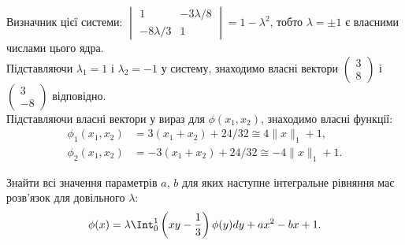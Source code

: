 \begin{solution}
    Визначник цієї системи: $\begin{vmatrix} 1 & - 3\lambda / 8 \\ - 8\lambda / 3 & 1 \end{vmatrix} = 1 - \lambda^2$, тобто $\lambda = \pm 1$ є власними числами цього ядра.\\
    
    Підставляючи $\lambda_1 = 1$ і $\lambda_2 = - 1$ у систему, знаходимо власні вектори $\begin{pmatrix} 3 \\ 8 \end{pmatrix}$ і $\begin{pmatrix} 3 \\ -8 \end{pmatrix}$ відповідно.\\
    
    Підставляючи власні вектори у вираз для $\phi(x_1, x_2)$, знаходимо власні функції:
    \begin{equation*}
        \begin{aligned}
            \phi_1(x_1, x_2) &= 3(x_1 + x_2) + 24 / 32 \cong 4 \|x\|_1 + 1, \\
            \phi_2(x_1, x_2) &= - 3(x_1 + x_2) + 24 / 32 \cong - 4 \|x\|_1 + 1.
        \end{aligned}
    \end{equation*}
\end{solution}

\begin{problem}[5.26.4, Владимиров]
    Знайти всі значення параметрів $a$, $b$ для яких наступне інтегральне рівняння має розв'язок для довільного $\lambda$:
    \[
        \phi(x) = \lambda \Int_0^1 \left(xy - \dfrac13\right) \phi(y) dy + ax^2 - bx + 1. 
    \]
\end{problem}

